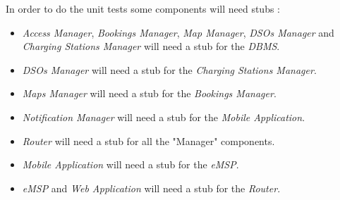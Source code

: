 \documentclass[a4paper]{report}
\begin{document}
In order to do the unit tests some components will need stubs :
\begin{itemize}
    \item \textit{Access Manager}, \textit{Bookings Manager}, \textit{Map Manager}, \textit{DSOs Manager} and \textit{Charging Stations Manager} will need a stub for the \textit{DBMS}.
    \item \textit{DSOs Manager} will need a stub for the \textit{Charging Stations Manager}.
    \item \textit{Maps Manager} will need a stub for the \textit{Bookings Manager}.
    \item \textit{Notification Manager} will need a stub for the \textit{Mobile Application}.
    \item \textit{Router} will need a stub for all the "Manager" components.
    \item \textit{Mobile Application} will need a stub for the \textit{eMSP}.
    \item \textit{eMSP} and \textit{Web Application} will need a stub for the \textit{Router}.
\end{itemize}
\end{document}
